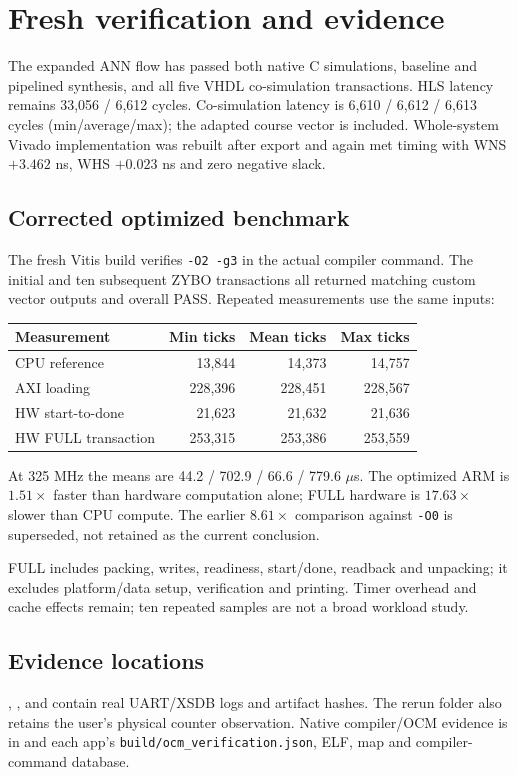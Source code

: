 \newpage
\section*{Fresh verification and evidence}
The expanded ANN flow has passed both native C simulations, baseline and
pipelined synthesis, and all five VHDL co-simulation transactions. HLS latency
remains 33,056 / 6,612 cycles. Co-simulation latency is 6,610 / 6,612 / 6,613
cycles (min/average/max); the adapted course vector is included. Whole-system
Vivado implementation was rebuilt after export and again met timing with
WNS $+3.462$ ns, WHS $+0.023$ ns and zero negative slack.

\subsection*{Corrected optimized benchmark}
The fresh Vitis build verifies \texttt{-O2 -g3} in the actual compiler command.
The initial and ten subsequent ZYBO transactions all returned matching custom
vector outputs and overall PASS. Repeated measurements use the same inputs:

\begin{center}
\begin{tabular}{lrrr}
\toprule Measurement & Min ticks & Mean ticks & Max ticks \\
\midrule
CPU reference & 13,844 & 14,373 & 14,757 \\
AXI loading & 228,396 & 228,451 & 228,567 \\
HW start-to-done & 21,623 & 21,632 & 21,636 \\
HW FULL transaction & 253,315 & 253,386 & 253,559 \\
\bottomrule
\end{tabular}
\end{center}
At 325 MHz the means are 44.2 / 702.9 / 66.6 / 779.6 $\mu$s. The optimized
ARM is $1.51\times$ faster than hardware computation alone; FULL hardware is
$17.63\times$ slower than CPU compute. The earlier $8.61\times$ comparison
against \texttt{-O0} is superseded, not retained as the current conclusion.

FULL includes packing, writes, readiness, start/done, readback and unpacking;
it excludes platform/data setup, verification and printing. Timer overhead and
cache effects remain; ten repeated samples are not a broad workload study.

\subsection*{Evidence locations}
,
,  and
 contain real UART/XSDB logs and artifact hashes.
The rerun folder also retains the user's physical counter observation.
Native compiler/OCM evidence is in
 and each app's
\texttt{build/ocm\_verification.json}, ELF, map and compiler-command database.

